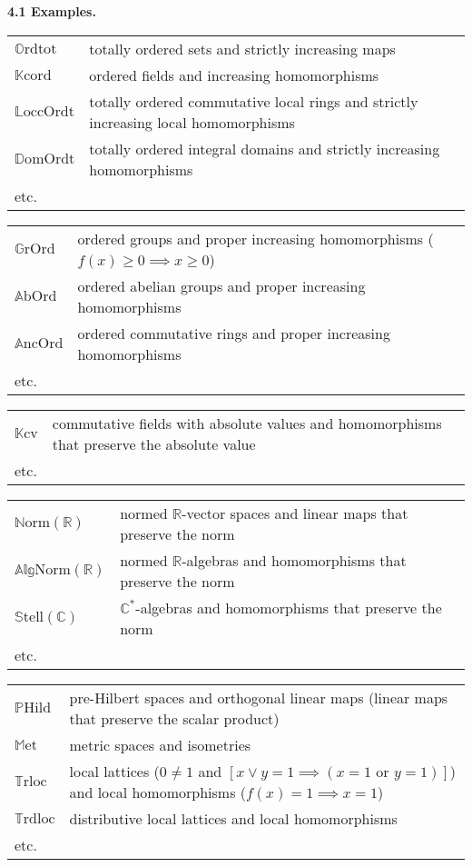 \documentclass{article}
\newenvironment{rmenv}[1]
  {\phantomsection\par\medskip\noindent\textbf{#1.}\rmfamily}
  {\par\medskip}
\newcommand{\bb}[1]{{\mathbb{#1}}}
\renewcommand{\geq}{\geqslant}
\begin{document}
\begin{rmenv}{4.1 Examples}
\begin{longtable}{p{0.5in}p{4.4in}}
  \\$\bb{O}\mathrm{rdtot}$ & totally ordered sets and strictly increasing maps
  \\$\bb{K}\mathrm{cord}$ & ordered fields and increasing homomorphisms
  \\$\bb{L}\mathrm{occOrdt}$ & totally ordered commutative local rings and strictly increasing local homomorphisms
  \\$\bb{D}\mathrm{omOrdt}$ & totally ordered integral domains and strictly increasing homomorphisms
  \\etc.
  \end{longtable}
  \begin{longtable}{p{0.5in}p{4.4in}}
    $\bb{G}\mathrm{rOrd}$ & ordered groups and proper increasing homomorphisms ($f(x)\geq0\implies x\geq0$)
  \\$\bb{A}\mathrm{bOrd}$ & ordered abelian groups and proper increasing homomorphisms
  \\$\bb{A}\mathrm{ncOrd}$ & ordered commutative rings and proper increasing homomorphisms
  \\etc.
  \end{longtable}
  \begin{longtable}{p{0.5in}p{4.4in}}
    $\bb{K}\mathrm{cv}$ & commutative fields with absolute values and homomorphisms that preserve the absolute value
  \\etc.
  \end{longtable}
  \begin{longtable}{p{0.5in}p{4.4in}}
    $\bb{N}\mathrm{orm}(\bb{R})$ & normed $\bb{R}$-vector spaces and linear maps that preserve the norm
  \\$\bb{Alg}\mathrm{Norm}(\bb{R})$ & normed $\bb{R}$-algebras and homomorphisms that preserve the norm
  \\$\bb{S}\mathrm{tell}(\bb{C})$ & $\bb{C}^*$-algebras and homomorphisms that preserve the norm
  \\etc.
  \end{longtable}
  \begin{longtable}{p{0.5in}p{4.4in}}
    $\bb{P}\mathrm{Hild}$ & pre-Hilbert spaces and orthogonal linear maps (linear maps that preserve the scalar product)
  \\$\bb{M}\mathrm{et}$ & metric spaces and isometries
  \\$\bb{T}\mathrm{rloc}$ & local lattices ($0\neq1$ and $[x\vee y=1\implies(\mbox{$x=1$ or $y=1$})]$) and local homomorphisms ($f(x)=1\implies x=1$)
  \\$\bb{T}\mathrm{rdloc}$ & distributive local lattices and local homomorphisms
  \\etc.
  \end{longtable}
\end{rmenv}
\end{document}
